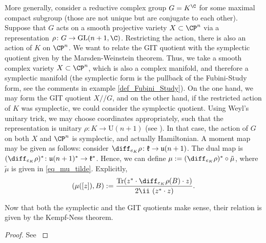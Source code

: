 More generally, consider a reductive complex group \(G=K^\C\) for some maximal compact subgroup (those are not unique but are conjugate to each other). Suppose that $G$ acts on a smooth projective variety $X \subset \CP^n$ via a representation $\rho \colon G \to \mathrm{GL}(n+1,\C)$. Restricting the action, there is also an action of \(K\) on \(\CP^n\). We want to relate the GIT quotient with the symplectic quotient given by the Marsden-Weinstein theorem. Thus, we take a smooth complex variety \(X \subset \CP^n\), which is also a complex manifold, and therefore a symplectic manifold (the symplectic form is the pullback of the Fubini-Study form, see the comments in example \ref{def_Fubini_Study}). On the one hand, we may form the GIT quotient \(X /\!\!/G\), and on the other hand, if the restricted action of \(K\) was symplectic, we could consider the symplectic quotient. Using Weyl's unitary trick, we may choose coordinates appropriately, such that the representation is unitary \(\rho \colon K \to \mathrm{U}(n+1)\) (see \parencite[Th. 12.3.9]{hilgert2011structure}). In that case, the action of \(G\) on both \(X\) and \(\CP^n\) is symplectic, and actually Hamiltonian. A moment map may be given as follows: consider \(\diff_{e_K}\rho\colon \mathfrak{k}\to \mathfrak{u}(n+1)\). The dual map is \((\diff_{e_K}\rho)^*\colon \mathfrak{u}(n+1)^* \to \mathfrak{k}^*\). Hence, we can define \(\mu:=(\diff_{e_K}\rho)^*\circ \tilde{\mu}\), where \(\tilde{\mu}\) is given in \eqref{eq_mu_tilde}. Explicitly,
\[
(\mu([z]), B) :=\frac{\mathrm{Tr}(z^* \cdot \diff_{e_K}\rho(B)\cdot z)}{2\ii \ (z^* \cdot z)}.
\]

Now that both the symplectic and the GIT quotients make sense, their relation is given by the Kempf-Ness theorem.
\begin{proof}
    See \parencite[Th. 10.3]{hoskins}
\end{proof}

